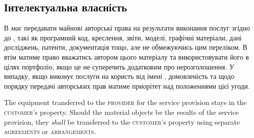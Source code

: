 \begin{Form}
\begin{paracol}{3}
{        \subsection{Інтелектуальна власність}
        В \textit{має} передавати  майнові авторські права на результати виконання послуг згідно до , такі як програмний код, креслення, звіти, моделі, графічні матеріали, дані досліджень, патенти, документація тощо, але не обмежуючись цим переліком. В втім матиме право вважатись автором цього матеріалу та використовувати його в цілях портфоліо, якщо це не суперечить додатковим  про нерозголошення. У випадку, якщо  виконує послуги на користь  від імені , домовленість  та  щодо порядку передачі авторських прав матиме приорітет над положеннями цієї угоди.}
        {
        The equipment transferred to the \textsc{provider} for the service provision stays in the \textsc{customer}'s property. Should the material objects be the results of the service provision, they \textit{shall} be transferred to the \textsc{customer}'s property using separate \textsc{agreements} or \textsc{arrangements}.

}
\end{paracol}
\end{Form}
